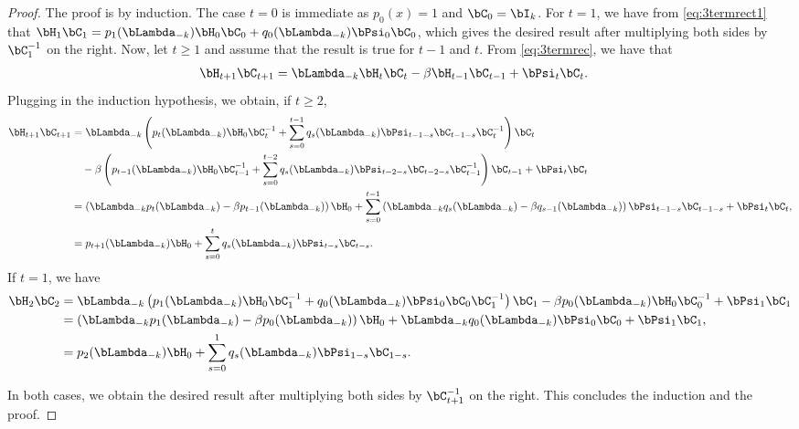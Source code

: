 \documentclass{article}
\theoremstyle{plain}
\theoremstyle{definition}
\theoremstyle{remark}
\begin{document}
\begin{proof}
  The proof is by induction. The case $t=0$ is immediate as $p_0(x) = 1$ and $\bC_0 = \bI_k$. For $t=1$, we have from \eqref{eq:3termrect1} that $\bH_1\bC_1 = p_1(\bLambda_{-k}) \bH_0 \bC_0 + q_0(\bLambda_{-k}) \bPsi_0 \bC_0$, which gives the desired result after multiplying both sides by $\bC_1^{-1}$ on the right. Now, let $t\geqslant 1$ and assume that the result is true for $t-1$ and $t$. From \eqref{eq:3termrec}, we have that
  \begin{align*}
    \bH_{t+1}\bC_{t+1} & = \bLambda_{-k} \bH_t \bC_t - \beta \bH_{t-1} \bC_{t-1} + \bPsi_t \bC_t.
  \end{align*}
  Plugging in the induction hypothesis, we obtain, if $t\geqslant 2$,
  \begin{align*}
    \bH_{t+1}\bC_{t+1} & = \bLambda_{-k} \left( p_t(\bLambda_{-k}) \bH_0 \bC_t^{-1}+ \sum_{s=0}^{t-1} q_{s}(\bLambda_{-k}) \bPsi_{t-1-s} \bC_{t-1-s}\bC_t^{-1} \right) \bC_t \\
    & \quad - \beta \left( p_{t-1}(\bLambda_{-k}) \bH_0 \bC_{t-1}^{-1}+ \sum_{s=0}^{t-2} q_{s}(\bLambda_{-k}) \bPsi_{t-2-s} \bC_{t-2-s}\bC_{t-1}^{-1} \right) \bC_{t-1} + \bPsi_t \bC_t \\
    & = \left( \bLambda_{-k} p_t(\bLambda_{-k}) - \beta p_{t-1}(\bLambda_{-k}) \right) \bH_0 + \sum_{s=0}^{t-1} \left( \bLambda_{-k} q_{s}(\bLambda_{-k}) - \beta q_{s-1}(\bLambda_{-k}) \right) \bPsi_{t-1-s} \bC_{t-1-s} + \bPsi_t \bC_t, \\
    & = p_{t+1}(\bLambda_{-k}) \bH_0 + \sum_{s=0}^{t} q_{s}(\bLambda_{-k}) \bPsi_{t-s} \bC_{t-s}.
  \end{align*}
  If $t=1$, we have
  \begin{align*}
    \bH_2\bC_2 & = \bLambda_{-k} \left( p_1(\bLambda_{-k}) \bH_0 \bC_1^{-1}+ q_{0}(\bLambda_{-k}) \bPsi_{0} \bC_{0}\bC_1^{-1} \right) \bC_1  - \beta  p_{0}(\bLambda_{-k}) \bH_0 \bC_{0}^{-1} +  \bPsi_1 \bC_1 \\
    & = \left( \bLambda_{-k} p_1(\bLambda_{-k}) - \beta p_{0}(\bLambda_{-k}) \right) \bH_0 + \bLambda_{-k} q_{0}(\bLambda_{-k}) \bPsi_{0} \bC_{0} + \bPsi_1 \bC_1, \\
    & = p_{2}(\bLambda_{-k}) \bH_0 + \sum_{s=0}^{1} q_{s}(\bLambda_{-k}) \bPsi_{1-s} \bC_{1-s}.
  \end{align*}

  In both cases, we obtain the desired result after multiplying both sides by $\bC_{t+1}^{-1}$ on the right. This concludes the induction and the proof.
\end{proof}
\end{document}
